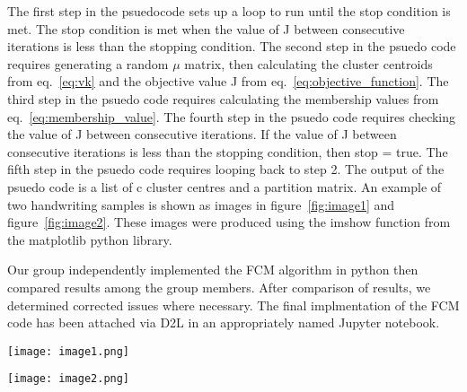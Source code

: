 The first step in the psuedocode sets up a loop to run until the stop condition is met. 
The stop condition is met when the value of J between consecutive iterations is less than the stopping condition. 
The second step in the psuedo code requires generating a random $\mu$ matrix, 
then calculating the cluster centroids from eq.~\ref{eq:vk} and the objective value J from eq.~\ref{eq:objective_function}. 
The third step in the psuedo code requires calculating the membership values from eq.~\ref{eq:membership_value}. 
The fourth step in the psuedo code requires checking the value of J between consecutive iterations. 
If the value of J between consecutive iterations is less than the stopping condition, then stop = true. 
The fifth step in the psuedo code requires looping back to step 2. 
The output of the psuedo code is a list of c cluster centres and a partition matrix. \newline
An example of two handwriting samples is shown as images in figure~\ref{fig:image1} and figure~\ref{fig:image2}. These images were produced using the imshow function from the matplotlib python library.

Our group independently implemented the FCM algorithm in python then compared results among the group members. After comparison of results, we determined corrected issues where necessary. The final implmentation of the FCM code has been attached via D2L in an appropriately named Jupyter notebook.


\begin{center}
\texttt{[image: image1.png]}
\end{center}

\begin{center}
\texttt{[image: image2.png]}
\end{center}    
        